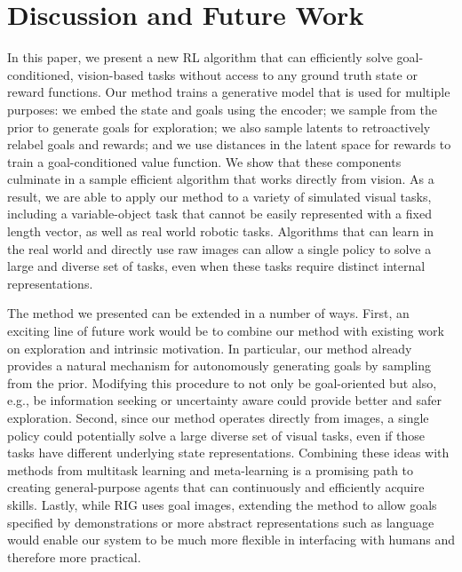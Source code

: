 \section{Discussion and Future Work}

In this paper, we present a new RL algorithm that can efficiently solve goal-conditioned, vision-based tasks without access to any ground truth state or reward functions.
Our method trains a generative model that is used for multiple purposes: we embed the state and goals using the encoder; we sample from the prior to generate goals for exploration; we also sample latents to retroactively relabel goals and rewards; and we use distances in the latent space for rewards to train a goal-conditioned value function.
We show that these components culminate in a sample efficient algorithm that works directly from vision.
As a result, we are able to apply our method to a variety of simulated visual tasks, including a variable-object task that cannot be easily represented with a fixed length vector, as well as real world robotic tasks.
Algorithms that can learn in the real world and directly use raw images can allow a single policy to solve a large and diverse set of tasks, even when these tasks require distinct internal representations.

The method we presented can be extended in a number of ways.
First, an exciting line of future work would be to combine our method with existing work on exploration and intrinsic motivation.
In particular, our method already provides a natural mechanism for autonomously generating goals by sampling from the prior.
Modifying this procedure to not only be goal-oriented but also, e.g., be information seeking or uncertainty aware could provide better and safer exploration.
Second, since our method operates directly from images, a single policy could potentially solve a large diverse set of visual tasks, even if those tasks have different underlying state representations.
Combining these ideas with methods from multitask learning and meta-learning is a promising path to creating general-purpose agents that can continuously and efficiently acquire skills.
Lastly, while RIG uses goal images, extending the method to allow goals specified by demonstrations or more abstract representations such as language would enable our system to be much more flexible in interfacing with humans and therefore more practical.
